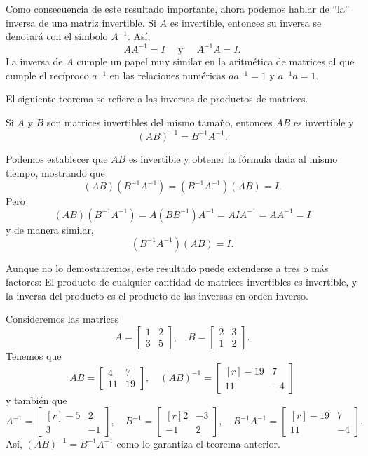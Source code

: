 Como consecuencia de este resultado importante, ahora podemos hablar de “la” inversa de una matriz invertible. Si $A$ es invertible, entonces su inversa se denotará con el símbolo $A^{-1}$. Así,
$$AA^{-1} = I \quad \text{ y } \quad A^{-1}A = I.$$
La inversa de $A$ cumple un papel muy similar en la aritmética de matrices al que cumple el recíproco $a^{-1}$ en las relaciones numéricas $aa^{-1} = 1$ y $a^{-1}a = 1$.

\newpage

El siguiente teorema se refiere a las inversas de productos de matrices.

\begin{theorem}{}{}
    Si $A$ y $B$ son matrices invertibles del mismo tamaño, entonces $AB$ es invertible y
    $$(AB)^{-1} = B^{-1}A^{-1}.$$

    \tcblower
    \demostracion Podemos establecer que $AB$ es invertible y obtener la fórmula dada al mismo tiempo, mostrando que
    $$(AB)\left(B^{-1}A^{-1}\right) = \left(B^{-1}A^{-1}\right)(AB) = I.$$
    Pero
    $$(AB)\left(B^{-1}A^{-1}\right) = A\left(BB^{-1}\right)A^{-1} = AIA^{-1} = AA^{-1} = I$$
    y de manera similar,
    $$\left(B^{-1}A^{-1}\right)(AB) = I.$$
\end{theorem}

Aunque no lo demostraremos, este resultado puede extenderse a tres o más factores: El producto de cualquier cantidad de matrices invertibles es invertible, y la inversa del producto es el producto de las inversas en orden inverso.

\begin{examplebox}{}{}
    Consideremos las matrices
    $$A = \begin{bmatrix} 1 & 2 \\ 3 & 5 \end{bmatrix}, \quad B = \begin{bmatrix} 2 & 3 \\ 1 & 2 \end{bmatrix}.$$
    Tenemos que
    $$AB = \begin{bmatrix} 4 & 7 \\ 11 & 19 \end{bmatrix}, \quad (AB)^{-1} = \begin{bmatrix*}[r] -19 & 7 \\ 11 & -4 \end{bmatrix*}$$
    y también que
    $$A^{-1} = \begin{bmatrix*}[r] -5 & 2 \\ 3 & -1 \end{bmatrix*}, \quad B^{-1} = \begin{bmatrix*}[r] 2 & -3 \\ -1 & 2 \end{bmatrix*}, \quad B^{-1}A^{-1} = \begin{bmatrix*}[r] -19 & 7 \\ 11 & -4 \end{bmatrix*}.$$
    Así, $(AB)^{-1} = B^{-1}A^{-1}$ como lo garantiza el teorema anterior.
\end{examplebox}

